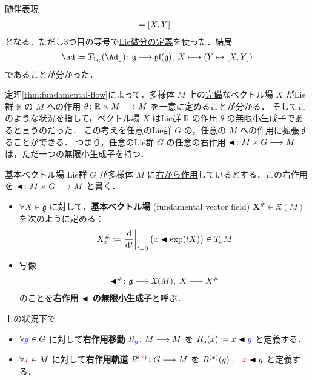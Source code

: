 \documentclass[TQFT_main]{subfiles}
\begin{document}
\begin{myexample}[label=def:Lie-adj]{随伴表現}
\begin{align}
        &= \comm{X}{Y}
    \end{align}
    となる．ただし3つ目の等号で\hyperref[def:Liedv]{Lie微分の定義}を使った．結局
    \begin{align}
        \ad \coloneqq T_{1_G} (\Adj) \colon \mathfrak{g} \lto \mathfrak{gl}(\mathfrak{g}),\; X \lmto (Y \mapsto \comm{X}{Y})
    \end{align}
    であることが分かった．
    
\end{myexample}

定理\ref{thm:fundamental-flow}によって，\cinfty 多様体 $M$ 上の\hyperref[def:vecf-complete]{完備}なベクトル場 $X$ がLie群 $\mathbb{R}$ の $M$ への作用 $\theta \colon \mathbb{R} \times M \longrightarrow M$ を一意に定めることが分かる．
そしてこのような状況を指して，ベクトル場 $X$ はLie群 $\mathbb{R}$ の作用 $\theta$ の無限小生成子であると言うのだった．
この考えを任意のLie群 $G$ の，任意の $M$ への作用に拡張することができる．
つまり，任意のLie群 $G$ の任意の右作用 $\blacktriangleleft \colon M \times G \longrightarrow M$ は，ただ一つの無限小生成子を持つ．

\begin{mydef}[label=def:fundamental-vecf]{基本ベクトル場}
    Lie群 $G$ が\cinfty 多様体 $M$ に\hyperref[def:Lie-action]{右から作用}しているとする．この右作用を $\blacktriangleleft \colon M \times G \longrightarrow M$ と書く．
    \begin{itemize}
        \item $\forall X \in \mathfrak{g}$ に対して，\textbf{基本ベクトル場} (fundamental vector field) $\bm{X^{\#}} \in \mathfrak{X}(M)$ を次のように定める：
        \begin{align}
            X^{\#}_x \coloneqq \eval{\dv{}{t}}_{t=0} \bigl(x \btl \exp(tX)\bigr) \in T_x M
        \end{align}
        \item 写像
        \begin{align}
            \blacktriangleleft^{\#} \colon \mathfrak{g} \longrightarrow \mathfrak{X}(M),\; X \longmapsto X^\#
        \end{align}
        のことを\textbf{右作用 $\blacktriangleleft$ の無限小生成子}と呼ぶ．
    \end{itemize}
    \tcblower
    上の状況下で
    \begin{itemize}
        \item $\forall \textcolor{blue}{g} \in G$ に対して\textbf{右作用移動} $R_{\textcolor{blue}{g}} \colon M \longrightarrow M$ を $R_g (x) \coloneqq x \blacktriangleleft \textcolor{blue}{g}$ と定義する．
        \item $\forall \textcolor{red}{x} \in M$ に対して\textbf{右作用軌道} $R^{(\textcolor{red}{x})} \colon G \longrightarrow M$ を $R^{(x)} (g) \coloneqq \textcolor{red}{x} \blacktriangleleft g$ と定義する．
    \end{itemize}
\end{mydef}
\end{document}
